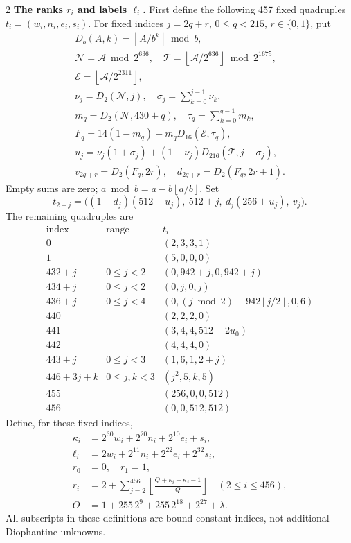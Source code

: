 \documentclass[10pt]{article}
\let\bigsum\sum
\renewcommand{\sum}{\bigsum\nolimits}
\newcommand{\fl}[1]{\left\lfloor #1\right\rfloor}
\begin{document}
\begin{multicols}{2}
\textbf{The ranks $r_i$ and labels $\ell_i$.}
First define the following 457 fixed quadruples
$t_i=(w_i,n_i,e_i,s_i)$.
For fixed indices $j=2q+r$, $0\le q<215$, $r\in\{0,1\}$, put
\[
\begin{gathered}
D_b(A,k)=\fl{A/b^k}\bmod b,\\
\mathcal N=\mathcal A\bmod2^{636},\quad
\mathcal T=\fl{\mathcal A/2^{636}}\bmod2^{1675},\\
\mathcal E=\fl{\mathcal A/2^{2311}},\\
\nu_j=D_2(\mathcal N,j),\quad \sigma_j=\sum_{k=0}^{j-1}\nu_k,\\
m_q=D_2(\mathcal N,430+q),\quad \tau_q=\sum_{k=0}^{q-1}m_k,\\
F_q=14(1-m_q)+m_qD_{16}(\mathcal E,\tau_q),\\
u_j=\nu_j(1+\sigma_j)+(1-\nu_j)D_{216}(\mathcal T,j-\sigma_j),\\
v_{2q+r}=D_2(F_q,2r),\quad d_{2q+r}=D_2(F_q,2r+1).
\end{gathered}
\]
Empty sums are zero; $a\bmod b=a-b\fl{a/b}$. Set
\[
t_{2+j}=\bigl((1-d_j)(512+u_j),\ 512+j,\ d_j(256+u_j),\ v_j\bigr).
\]
The remaining quadruples are
\[
\begin{array}{c|c|l}
\text{index}&\text{range}&t_i\\\hline
0&& (2,3,3,1)\\
1&& (5,0,0,0)\\
432+j&0\le j<2&(0,942+j,0,942+j)\\
434+j&0\le j<2&(0,j,0,j)\\
436+j&0\le j<4&(0,(j\bmod2)+942\fl{j/2},0,6)\\
440&&(2,2,2,0)\\
441&&(3,4,4,512+2u_0)\\
442&&(4,4,4,0)\\
443+j&0\le j<3&(1,6,1,2+j)\\
446+3j+k&0\le j,k<3&(j^2,5,k,5)\\
455&&(256,0,0,512)\\
456&&(0,0,512,512)
\end{array}
\]
Define, for these fixed indices,
\begin{align*}
\kappa_i&=2^{30}w_i+2^{20}n_i+2^{10}e_i+s_i,\\
\ell_i&=2w_i+2^{11}n_i+2^{22}e_i+2^{32}s_i,\\
r_0&=0,\quad r_1=1,\\
r_i&=2+\sum_{j=2}^{456}\fl{\frac{Q+\kappa_i-\kappa_j-1}{Q}}
 \quad(2\le i\le456),\\
O&=1+255\,2^9+255\,2^{18}+2^{27}+\lambda.
\end{align*}
All subscripts in these definitions are bound constant indices, not
additional Diophantine unknowns.


\end{multicols}
\end{document}
